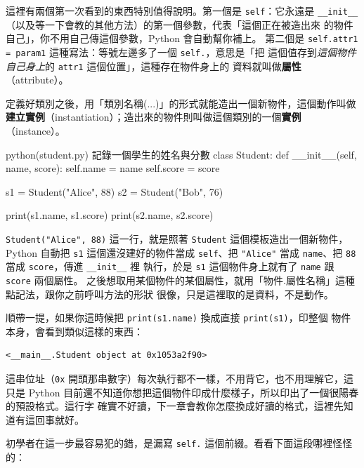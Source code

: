 這裡有兩個第一次看到的東西特別值得說明。第一個是 \texttt{self}：它永遠是
\texttt{\_\_init\_\_}（以及等一下會教的其他方法）的第一個參數，代表「這個正在被造出來
的物件自己」，你不用自己傳這個參數，Python 會自動幫你補上。
第二個是
\texttt{self.attr1 = param1} 這種寫法：等號左邊多了一個 \texttt{self.}，意思是「把
這個值存到\textit{這個物件自己身上}的 \texttt{attr1} 這個位置」，這種存在物件身上的
資料就叫做\textbf{屬性}（attribute）。

定義好類別之後，用「類別名稱(...)」的形式就能造出一個新物件，這個動作叫做
\textbf{建立實例}（instantiation）；造出來的物件則叫做這個類別的一個\textbf{實例}
（instance）。

\begin{example}{python}{(student.py) 記錄一個學生的姓名與分數}
class Student:
    def __init__(self, name, score):
        self.name = name
        self.score = score


s1 = Student("Alice", 88)
s2 = Student("Bob", 76)

print(s1.name, s1.score)
print(s2.name, s2.score)
\end{example}


\texttt{Student("Alice", 88)} 這一行，就是照著 \texttt{Student} 這個模板造出一個新物件，
Python 自動把 \texttt{s1} 這個還沒建好的物件當成 \texttt{self}、把 \texttt{"Alice"}
當成 \texttt{name}、把 \texttt{88} 當成 \texttt{score}，傳進 \texttt{\_\_init\_\_} 裡
執行，於是 \texttt{s1} 這個物件身上就有了 \texttt{name} 跟 \texttt{score} 兩個屬性。
之後想取用某個物件的某個屬性，就用「物件.屬性名稱」這種點記法，跟你之前呼叫方法的形狀
很像，只是這裡取的是資料，不是動作。

順帶一提，如果你這時候把 \texttt{print(s1.name)} 換成直接 \texttt{print(s1)}，印整個
物件本身，會看到類似這樣的東西：

\begin{verbatim}
<__main__.Student object at 0x1053a2f90>
\end{verbatim}

這串位址（\texttt{0x} 開頭那串數字）每次執行都不一樣，不用背它，也不用理解它，這只是
Python 目前還不知道你想把這個物件印成什麼樣子，所以印出了一個很陽春的預設格式。這行字
確實不好讀，下一章會教你怎麼換成好讀的格式，這裡先知道有這回事就好。

初學者在這一步最容易犯的錯，是漏寫 \texttt{self.} 這個前綴。看看下面這段哪裡怪怪的：

